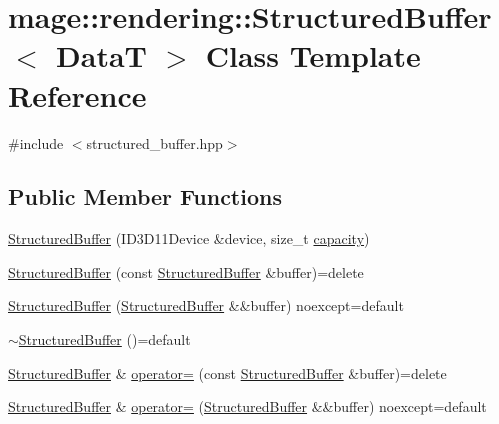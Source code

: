 \hypertarget{classmage_1_1rendering_1_1_structured_buffer}{}\section{mage\+:\+:rendering\+:\+:Structured\+Buffer$<$ DataT $>$ Class Template Reference}
\label{classmage_1_1rendering_1_1_structured_buffer}


{\ttfamily \#include $<$structured\+\_\+buffer.\+hpp$>$}

\subsection*{Public Member Functions}
\begin{DoxyCompactItemize}
\item 
\mbox{\hyperlink{classmage_1_1rendering_1_1_structured_buffer_a7a12044b41fccd5c3a9c6d600ae8fd14}{Structured\+Buffer}} (I\+D3\+D11\+Device \&device, size\+\_\+t \mbox{\hyperlink{classmage_1_1rendering_1_1_structured_buffer_acbcdaebd04869e0248b8394c4823c433}{capacity}})
\item 
\mbox{\hyperlink{classmage_1_1rendering_1_1_structured_buffer_a447ca1bad6b4dc97bd993ce6e621f16a}{Structured\+Buffer}} (const \mbox{\hyperlink{classmage_1_1rendering_1_1_structured_buffer}{Structured\+Buffer}} \&buffer)=delete
\item 
\mbox{\hyperlink{classmage_1_1rendering_1_1_structured_buffer_ac6e1af93013761263b4ca418609b0518}{Structured\+Buffer}} (\mbox{\hyperlink{classmage_1_1rendering_1_1_structured_buffer}{Structured\+Buffer}} \&\&buffer) noexcept=default
\item 
\mbox{\hyperlink{classmage_1_1rendering_1_1_structured_buffer_a6c2ccb0efe7157e94f841981be71b6c7}{$\sim$\+Structured\+Buffer}} ()=default
\item 
\mbox{\hyperlink{classmage_1_1rendering_1_1_structured_buffer}{Structured\+Buffer}} \& \mbox{\hyperlink{classmage_1_1rendering_1_1_structured_buffer_a87a27778bf6097f84b63acc0eef49a3a}{operator=}} (const \mbox{\hyperlink{classmage_1_1rendering_1_1_structured_buffer}{Structured\+Buffer}} \&buffer)=delete
\item 
\mbox{\hyperlink{classmage_1_1rendering_1_1_structured_buffer}{Structured\+Buffer}} \& \mbox{\hyperlink{classmage_1_1rendering_1_1_structured_buffer_a488f44cb1e47689e5f7383ae8bdef823}{operator=}} (\mbox{\hyperlink{classmage_1_1rendering_1_1_structured_buffer}{Structured\+Buffer}} \&\&buffer) noexcept=default

\end{DoxyCompactItemize}
